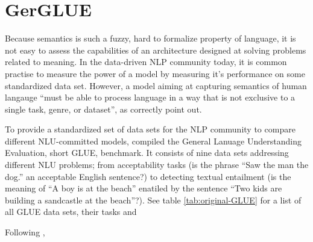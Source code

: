 \label{chap:3_datasets}


\section{GerGLUE}

Because semantics is such a fuzzy, hard to formalize property of language, it is not easy to
assess the capabilities of an architecture designed at solving problems related to meaning. In
the data-driven NLP community today, it is common practise to measure the {\color{red} power of
a model} by measuring it's performance on some standardized data set. However, a model aiming at
capturing semantics of human langauge ``must be able to process language in a way that is not
exclusive to a single task, genre, or dataset'', as \cite{wang2018glue} correctly point out.

To provide a standardized set of data sets for the NLP community to compare different NLU-committed
models, \citeauthor{wang2018glue} compiled the General Lanuage Understanding Evaluation, short
GLUE, benchmark. It consists of nine data sets addressing different NLU problems; from acceptability
tasks (is the phrase ``Saw the man the dog.'' an acceptable English sentence?) to detecting
textual entailment (is the meaning of ``A boy is at the beach'' enatiled by the sentence
``Two kids are building a sandcastle at the beach''?). See table \ref{tab:original-GLUE} for
a list of all GLUE data sets, their tasks and




Following \cite{wang2018glue},

